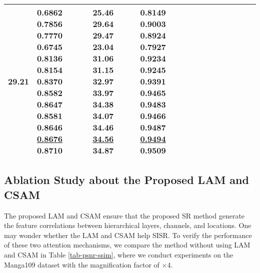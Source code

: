 \documentclass[runningheads]{llncs}
\begin{document}
\begin{table}[t]
\begin{tabular}{|p{6.5em}|p{2.5em}|p{2.5em}|p{3em}|p{2.5em}|p{3em}|p{2.5em}|p{3em}|p{2.5em}|p{3em}|p{2.5em}|p{3em}|}
\newline{}\bfseries{29.21}  & 0.6862 \newline{}0.7856 \newline{}0.7770 \newline{}0.6745 \newline{}0.8136 \newline{}0.8154 \newline{}0.8370 \newline{}0.8582 \newline{}0.8647 \newline{}0.8581 \newline{}0.8646 \newline{}\underline{0.8676} \newline{}\bfseries{0.8710}  &25.46 \newline{}29.64 \newline{}29.47 \newline{}23.04 \newline{}31.06 \newline{}31.15 \newline{}32.97 \newline{}33.97 \newline{}34.38 \newline{}34.07 \newline{}34.46 \newline{}\underline{34.56} \newline{}\bfseries{34.87} &0.8149\newline{} 0.9003\newline{} 0.8924\newline{} 0.7927\newline{} 0.9234\newline{} 0.9245\newline{} 0.9391\newline{} 0.9465\newline{} 0.9483 \newline{} 0.9466 \newline{} 0.9487 \newline{}\underline{0.9494} \newline{}\bfseries{0.9509} \\
		\hline
	\end{tabular}\label{tab-BD}\end{table}



\subsection{Ablation Study about the Proposed LAM and CSAM}
The proposed LAM and CSAM ensure that the proposed SR method generate the feature correlations between hierarchical layers, channels, and locations. One may wonder whether the LAM and CSAM help SISR.
To verify the performance of these two attention mechanisms, we compare the method without using LAM and CSAM in Table \ref{tab-psnr-ssim}, where we conduct experiments on the Manga109 dataset with the magnification factor of $\times4$. 
\end{document}
